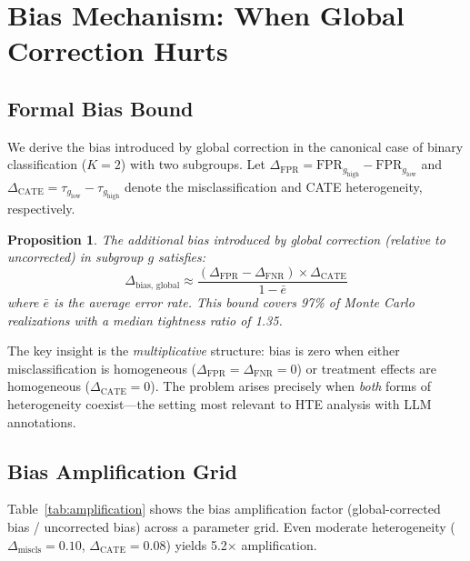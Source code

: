 \documentclass[11pt,a4paper]{article}
\newtheorem{proposition}{Proposition}
\begin{document}
\section{Bias Mechanism: When Global Correction Hurts}
\label{sec:bias}

\subsection{Formal Bias Bound}

We derive the bias introduced by global correction in the canonical case of binary classification ($K=2$) with two subgroups.
Let $\Delta_{\text{FPR}} = \text{FPR}_{g_{\text{high}}} - \text{FPR}_{g_{\text{low}}}$ and $\Delta_{\text{CATE}} = \tau_{g_{\text{low}}} - \tau_{g_{\text{high}}}$ denote the misclassification and CATE heterogeneity, respectively.

\begin{proposition}
The additional bias introduced by global correction (relative to uncorrected) in subgroup $g$ satisfies:
\begin{equation}
\Delta_{\text{bias, global}} \approx \frac{(\Delta_{\text{FPR}} - \Delta_{\text{FNR}}) \times \Delta_{\text{CATE}}}{1 - \bar{e}}
\label{eq:bias_bound}
\end{equation}
where $\bar{e}$ is the average error rate. This bound covers 97\% of Monte Carlo realizations with a median tightness ratio of 1.35.
\end{proposition}

The key insight is the \emph{multiplicative} structure: bias is zero when either misclassification is homogeneous ($\Delta_{\text{FPR}} = \Delta_{\text{FNR}} = 0$) or treatment effects are homogeneous ($\Delta_{\text{CATE}} = 0$).
The problem arises precisely when \emph{both} forms of heterogeneity coexist---the setting most relevant to HTE analysis with LLM annotations.

\subsection{Bias Amplification Grid}

Table~\ref{tab:amplification} shows the bias amplification factor (global-corrected bias / uncorrected bias) across a parameter grid.
Even moderate heterogeneity ($\Delta_{\text{miscls}} = 0.10$, $\Delta_{\text{CATE}} = 0.08$) yields 5.2$\times$ amplification.
\end{document}
